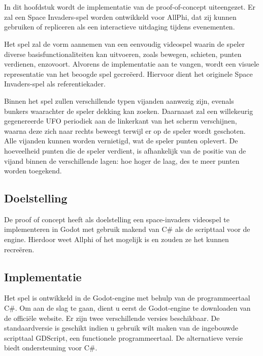 
\chapter{}%
\label{ch:proof-of-concept}

In dit hoofdstuk wordt de implementatie van de proof-of-concept uiteengezet. Er zal een Space Invaders-spel worden ontwikkeld voor AllPhi, dat zij kunnen gebruiken of repliceren als een interactieve uitdaging tijdens evenementen.

Het spel zal de vorm aannemen van een eenvoudig videospel waarin de speler diverse basisfunctionaliteiten kan uitvoeren, zoals bewegen, schieten, punten verdienen, enzovoort. Alvorens de implementatie aan te vangen, wordt een visuele representatie van het beoogde spel gecreëerd. Hiervoor dient het originele Space Invaders-spel als referentiekader.

Binnen het spel zullen verschillende typen vijanden aanwezig zijn, evenals bunkers waarachter de speler dekking kan zoeken. Daarnaast zal een willekeurig gegenereerde UFO periodiek aan de linkerkant van het scherm verschijnen, waarna deze zich naar rechts beweegt terwijl er op de speler wordt geschoten. Alle vijanden kunnen worden vernietigd, wat de speler punten oplevert. De hoeveelheid punten die de speler verdient, is afhankelijk van de positie van de vijand binnen de verschillende lagen: hoe hoger de laag, des te meer punten worden toegekend.

\section{Doelstelling}
De proof of concept heeft als doelstelling een space-invaders videospel te implementeren in Godot met gebruik makend van C\# als de scripttaal voor de engine. Hierdoor weet Allphi of het mogelijk is en zouden ze het kunnen recreëren.

\section{Implementatie}
Het spel is ontwikkeld in de Godot-engine met behulp van de programmeertaal C\#. Om aan de slag te gaan, dient u eerst de Godot-engine te downloaden van de officiële website. Er zijn twee verschillende versies beschikbaar. De standaardversie is geschikt indien u gebruik wilt maken van de ingebouwde scripttaal GDScript, een functionele programmeertaal. De alternatieve versie biedt ondersteuning voor C\#.

